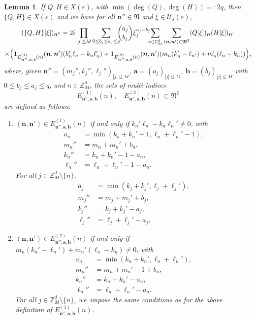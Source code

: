\documentclass[10pt,a4paper]{amsart}
\theoremstyle{plain}
\newtheorem{lemma}[theorem]{Lemma}
\theoremstyle{definition}
\newcommand{\nb}{{\boldsymbol n}}
\newcommand{\Nb}{{\boldsymbol{\mathfrak{N}}}}
\newcommand{\Z}{\mathbb{Z}}
\newcommand{\1}{\mathbf{1}}
\let\epsilon\varepsilon
\begin{document}
\begin{lemma}\label{lem:bra}
If $Q,H\in X(\epsilon)$, with $\min(\deg(Q),\deg(H))=:2q$, then $\{Q,H\}\in X(\epsilon)$ and we have
for all $\nb''\in\Nb$ and $\xi\in\mathcal{U}_{s}(\epsilon)$,
\begin{multline}
\label{eq:pn}
(\{Q,H\}[\xi])_{\nb''}
= 2i\prod_{|j|\leq M}
\sum_{0\leq b_{j}\leq a_{j}\leq q}\hspace*{-2mm}
\binom{a_{j}}{b_{j}}\xi_{j}^{a_{j}-b_{j}}\hspace*{-2mm}
\sum_{n\in\Z_{M}^{d}}
\sum_{(\nb,\nb')\in \Nb^{2}}
(Q[\xi])_{\nb}(H[\xi])_{\nb'}\\
\times\Big(
\mathbf{1}_{E^{(1)}_{\nb'',\boldsymbol{a},\boldsymbol{b}}(n)}(\nb,\nb')(k_{n}'\ell_{n}-k_{n}\ell_{n}')
+\mathbf{1}_{E^{(2)}_{\nb'',\boldsymbol{a},\boldsymbol{b}}(n)}(\nb,\nb') (m_{n}(k_{n}'-\ell_{n'})+m_{n}'(\ell_{n}-k_{n}))
\Big),
\end{multline}
where, given $\nb''=(m_{j}'',k_{j}'',\ell_{j}'')_{|j|\leq M}$, $\boldsymbol{a}=(a_{j})_{|j|\leq M},\ \boldsymbol{b}=(b_{j})_{|j|\leq M}$ with $0\leq b_{j}\leq a_{j}\leq q$, and $n\in\Z_{M}^{d}$, the sets of multi-indices
\[
E_{\nb'',\boldsymbol{a},\boldsymbol{b}}^{(1)}(n),\quad E_{\nb'',\boldsymbol{a},\boldsymbol{b}}^{(2)}(n) \subset \Nb^2
\]
are defined as follows:
\begin{enumerate}
\item $(\nb,\nb')\in E_{\nb'',\boldsymbol{a},\boldsymbol{b}}^{(1)}(n)$ if and only if $k_n'\ell_n-k_n\ell_n'\neq 0$, with
\begin{align*}
a_{n} &= \min(k_{n}+k_{n}'-1,\ell_{n}+\ell_{n}'-1),\\
\tag*{and}
m_n'' &= m_n+m_n'+b_{n},\\
k_n'' &= k_n+k_n'-1 - a_{n},\\
\ell_n'' &=\ell_n+\ell_n'-1 - a_{n}.
\end{align*}
For all $j\in \Z_{M}^{d}\setminus\{n\}$,
\begin{align*}
a_{j} &= \min(k_{j}+k_{j}',\ell_{j}+\ell_{j}'),\\
\tag*{and}
m_j'' &= m_j+m_j'+b_{j},\\
k_j'' &= k_j+k_j' - a_{j}, \\
\ell_j'' &= \ell_j+\ell_j'- a_{j},
\end{align*}
\item $(\nb,\nb')\in E_{\nb'',\boldsymbol{a},\boldsymbol{b}}^{(2)}(n)$ if and only if $m_{n}(k_{n}'-\ell_{n}')+m_{n}'(\ell_{n}-k_{n})\neq0$, with
\begin{align*}
a_{n} &= \min(k_{n}+k_{n}', \ell_{n}+\ell_{n}'),\\
\tag*{and}
m_n'' &= m_n+m_n'-1+b_{n},\\
k_n'' &= k_n+k_n' -a_{n}, \\
\ell_n''&= \ell_n+\ell_n'-a_{n}.
\end{align*}
For all $j\in\Z_{M}^{d}\setminus\{n\}$, we~impose
the same conditions as for the above definition of $E_{\nb'',\boldsymbol{a},\boldsymbol{b}}^{(1)}(n)$.
\end{enumerate}
\end{lemma}
\end{document}
